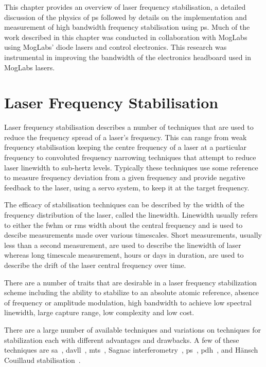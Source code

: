 This chapter provides an overview of laser frequency stabilisation, a detailed discussion of the physics of \gls{ps} followed by details on the implementation and measurement of high bandwidth frequency stabilisation using \gls{ps}.
Much of the work described in this chapter was conducted in collaboration with MogLabs using MogLabs' diode lasers and control electronics.
This research was instrumental in improving the bandwidth of the electronics headboard used in MogLabs lasers.

\section{Laser Frequency Stabilisation}

Laser frequency stabilisation describes a number of techniques that are used to reduce the frequency spread of a laser's frequency.
This can range from weak frequency stabilisation keeping the centre frequency of a laser at a particular frequency to convoluted frequency narrowing techniques that attempt to reduce laser linewidth to sub-hertz levels.
Typically these techniques use some reference to measure frequency deviation from a given frequency and provide negative feedback to the laser, using a servo system, to keep it at the target frequency.

The efficacy of stabilisation techniques can be described by the width of the frequency distribution of the laser, called the linewidth.
Linewidth usually refers to either the \gls{fwhm} or \gls{rms} width about the central frequency and is used to descibe measurements made over various timescales.
Short measurements, usually less than a second measurement, are used to describe the linewidth of laser whereas long timescale measurement, hours or days in duration, are used to describe the drift of the laser central frequency over time.

There are a number of traits that are desirable in a laser frequency stabilization scheme including the ability to stabilize to an absolute atomic reference, absence of frequency or amplitude modulation, high bandwidth to achieve low spectral linewidth, large capture range, low complexity and low cost.

There are a large number of available techniques and variations on techniques for stabilization each with different advantages and drawbacks.
A few of these techniques are \gls{sa}~\cite{haroche_theory_1972, maguire_theoretical_2006, cuneo_optically_1994, preston_doppler-free_1996, saliba_linewidths_2009}, \gls{davll}~\cite{corwin_frequency-stabilized_1998, millett-sikking_davll_2007}, \gls{mts}~\cite{shirley_modulation_1982, mccarron_modulation_2008, xiang-hui_ultra-stable_2009,negnevitsky_wideband_2013}, Sagnac interferometry~\cite{robins_Interferometric_2002, jundt_non-linear_2003}, \acrfull{ps}~\cite{wieman_doppler-free_1976, lancaster_polarisation_1999, yoshikawa_frequency_2003, harris_polarization_2006, pearman_polarization_2002, tiwari_laser_2006, do_polarization_2008, torii_laser-phase_2012}, \gls{pdh}~\cite{drever_laser_1983}, and H\"ansch Couillaud stabilisation~\cite{hansch_laser_1980}.


